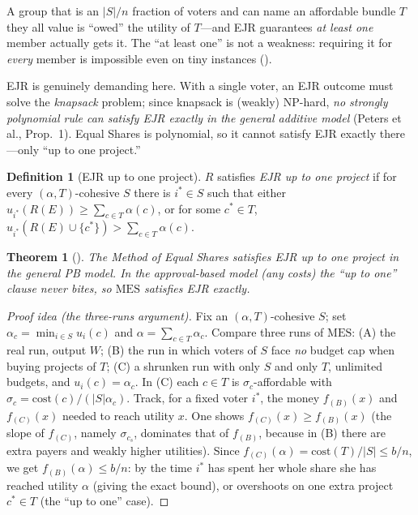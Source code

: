 \documentclass[11pt,letterpaper]{article}
\theoremstyle{definition}
\newtheorem{definition}{Definition}[section]
\theoremstyle{plain}
\newtheorem{theorem}{Theorem}[section]
\theoremstyle{remark}
\newcommand{\budget}{b}            %
\newcommand{\cost}{\mathrm{cost}}  %
\newcommand{\MES}{\mathrm{MES}}
\begin{document}
\begin{keyidea}
A group that is an $|S|/n$ fraction of voters and can name an affordable bundle $T$ they all value
is ``owed'' the utility of $T$---and EJR guarantees \emph{at least one} member actually gets it.
The ``at least one'' is not a weakness: requiring it for \emph{every} member is impossible even on
tiny instances (\citealp{aziz2017}).
\end{keyidea}

\begin{watchout}
EJR is genuinely demanding here. With a single voter, an EJR outcome must solve the
\emph{knapsack} problem; since knapsack is (weakly) NP-hard, \emph{no strongly polynomial rule can
satisfy EJR exactly in the general additive model} (Peters et al., Prop.~1). Equal Shares is
polynomial, so it cannot satisfy EJR exactly there---only ``up to one project.''
\end{watchout}

\begin{definition}[EJR up to one project]
\label{def:ejr1}
$R$ satisfies \emph{EJR up to one project} if for every $(\alpha,T)$-cohesive $S$ there is
$i^\ast\in S$ such that either $u_{i^\ast}(R(E))\ge\sum_{c\in T}\alpha(c)$, or for some $c^\ast\in
T$, $u_{i^\ast}(R(E)\cup\{c^\ast\})>\sum_{c\in T}\alpha(c)$.
\end{definition}

\begin{theorem}[\citealp{peters2021}]
\label{thm:mes-ejr}
The Method of Equal Shares satisfies EJR up to one project in the general PB model. In the
approval-based model (any costs) the ``up to one'' clause never bites, so $\MES$ satisfies EJR
\emph{exactly}.
\end{theorem}

\begin{proof}[Proof idea (the three-runs argument)]
Fix an $(\alpha,T)$-cohesive $S$; set $\alpha_c=\min_{i\in S}u_i(c)$ and $\alpha=\sum_{c\in
T}\alpha_c$. Compare three runs of $\MES$: (A) the real run, output $W$; (B) the run in which
voters of $S$ face \emph{no} budget cap when buying projects of $T$; (C) a shrunken run with only
$S$ and only $T$, unlimited budgets, and $u_i(c)=\alpha_c$. In (C) each $c\in T$ is
$\sigma_c$-affordable with $\sigma_c=\cost(c)/(|S|\alpha_c)$. Track, for a fixed voter $i^\ast$, the
money $f_{(B)}(x)$ and $f_{(C)}(x)$ needed to reach utility $x$. One shows
$f_{(C)}(x)\ge f_{(B)}(x)$ (the slope of $f_{(C)}$, namely $\sigma_{c_s}$, dominates that of
$f_{(B)}$, because in (B) there are extra payers and weakly higher utilities). Since
$f_{(C)}(\alpha)=\cost(T)/|S|\le \budget/n$, we get $f_{(B)}(\alpha)\le \budget/n$: by the time
$i^\ast$ has spent her whole share she has reached utility $\alpha$ (giving the exact bound), or
overshoots on one extra project $c^\ast\in T$ (the ``up to one'' case). \hfill
\end{proof}
\end{document}
